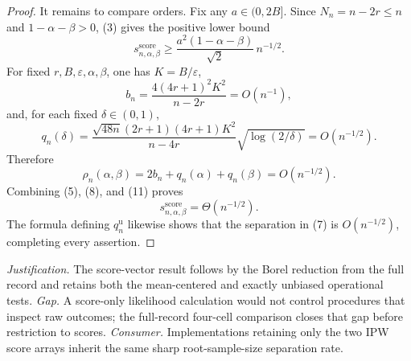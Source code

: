 \documentclass{article}
\begin{document}
\begin{proof}
It remains to compare orders.  Fix any \(a\in(0,2B]\).  Since \(N_n=n-2r\le n\) and \(1-\alpha-\beta>0\), (3) gives the positive lower bound
\[
 s_{n,\alpha,\beta}^{\mathrm{score}}
 \ge \frac{a^2(1-\alpha-\beta)}{\sqrt{2}}\,n^{-1/2}. \tag{8}
\]
For fixed \(r,B,\varepsilon,\alpha,\beta\), one has \(K=B/\varepsilon\),
\[
 b_n=\frac{4(4r+1)^2K^2}{n-2r}=O(n^{-1}), \tag{9}
\]
and, for each fixed \(\delta\in(0,1)\),
\[
 q_n(\delta)
 =\frac{\sqrt{48n}(2r+1)(4r+1)K^2}{n-4r}
   \sqrt{\log(2/\delta)}
 =O(n^{-1/2}). \tag{10}
\]
Therefore
\[
 \rho_n(\alpha,\beta)
 =2b_n+q_n(\alpha)+q_n(\beta)
 =O(n^{-1/2}). \tag{11}
\]
Combining (5), (8), and (11) proves
\[
 s_{n,\alpha,\beta}^{\mathrm{score}}=\Theta(n^{-1/2}). \tag{12}
\]
The formula defining \(q_n^{\mathrm u}\) likewise shows that the separation in (7) is \(O(n^{-1/2})\), completing every assertion.
\end{proof}
\par\smallskip\noindent \textit{Justification.} The score-vector result follows by the Borel reduction from the full record and retains both the mean-centered and exactly unbiased operational tests. \textit{Gap.} A score-only likelihood calculation would not control procedures that inspect raw outcomes; the full-record four-cell comparison closes that gap before restriction to scores. \textit{Consumer.} Implementations retaining only the two IPW score arrays inherit the same sharp root-sample-size separation rate.
\end{document}
